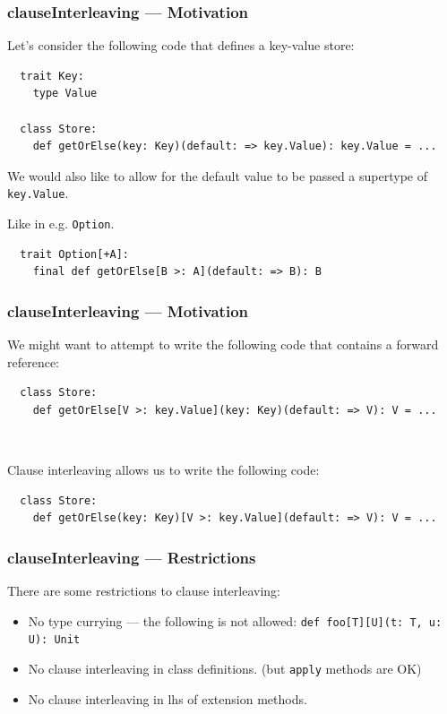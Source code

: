 \documentclass{beamer}
\begin{document}
\begin{frame}[fragile]
  \frametitle{clauseInterleaving --- Motivation}

  Let's consider the following code that defines a key-value store:

  \begin{lstlisting}
  trait Key:
    type Value
  
  class Store:
    def getOrElse(key: Key)(default: => key.Value): key.Value = ...
  \end{lstlisting}

  We would also like to allow for the default value to be passed a supertype of \texttt{key.Value}.

  Like in e.g. \texttt{Option}.

  \begin{lstlisting}
  trait Option[+A]:
    final def getOrElse[B >: A](default: => B): B
  \end{lstlisting}
  
\end{frame}

\begin{frame}[fragile]
  \frametitle{clauseInterleaving --- Motivation}

  We might want to attempt to write the following code that contains a forward reference:

  \begin{lstlisting}
  class Store:
    def getOrElse[V >: key.Value](key: Key)(default: => V): V = ...
  \end{lstlisting}

  \pause\

  Clause interleaving allows us to write the following code:

  \begin{lstlisting}
  class Store:
    def getOrElse(key: Key)[V >: key.Value](default: => V): V = ...
  \end{lstlisting}

\end{frame}

\begin{frame}
  \frametitle{clauseInterleaving --- Restrictions}

  There are some restrictions to clause interleaving:

  \begin{itemize}
    \item No type currying --- the following is not allowed: \lstinline{def foo[T][U](t: T, u: U): Unit}
    \item No clause interleaving in class definitions. (but \texttt{apply} methods are OK)
    \item No clause interleaving in lhs of extension methods.
  \end{itemize}

\end{frame}
\end{document}
